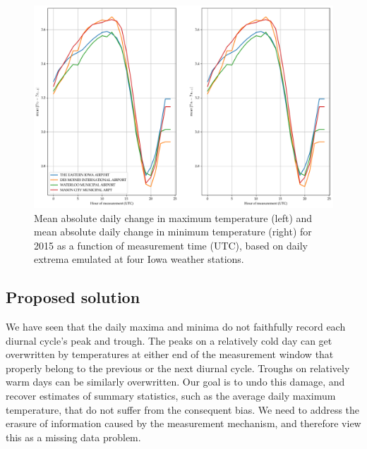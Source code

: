 \documentclass[letter]{article}
\makeatletter
\def\maxwidth{\ifdim\Gin@nat@width>\linewidth\linewidth
\else\Gin@nat@width\fi}
\let\Oldincludegraphics\includegraphics
\renewcommand{\includegraphics}[1]{\Oldincludegraphics[width=0.98\maxwidth]{#1}}
\makeatother
\begin{document}
\begin{figure}
\centering
\includegraphics{../figures/waterloo_meanabsdiff.png}
\caption{\label{fig:waterloo_meanabsdiff}
Mean absolute daily change in maximum temperature (left)
and mean absolute daily change in minimum temperature (right)
for 2015 as a function of measurement time (UTC),
based on daily extrema emulated at four Iowa weather stations.}
\end{figure}
    


        \subsection{Proposed solution}\label{proposed-solution}

We have seen that the daily maxima and minima do not faithfully record each diurnal cycle's peak and trough.
The peaks on a relatively cold day can get overwritten by temperatures at either end of the measurement window that properly belong to the previous or the next diurnal cycle.
Troughs on relatively warm days can be similarly overwritten.
Our goal is to undo this damage, and recover estimates of summary statistics, such as the average daily maximum temperature, that do not suffer from the consequent bias.
We need to address the erasure of information caused by the measurement mechanism, and therefore view this as a missing data problem.
\end{document}
